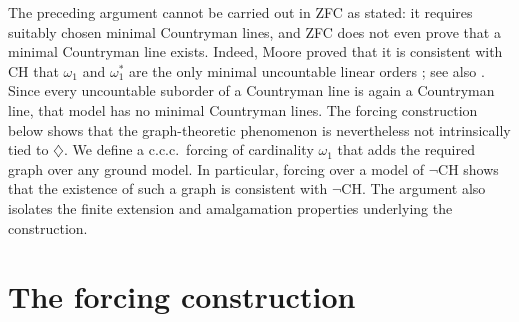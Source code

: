 \documentclass[10pt,a4paper]{amsart}
\numberwithin{equation}{section}
\theoremstyle{definition}
\theoremstyle{remark}
\begin{document}
The preceding argument cannot be carried out in ZFC as stated: it
requires suitably chosen minimal Countryman lines, and ZFC does not
even prove that a minimal Countryman line exists.  Indeed, Moore proved
that it is consistent with CH that $\omega_1$ and $\omega_1^*$ are the
only minimal uncountable linear orders \cite{Moore2007}; see also
\cite[Theorem~1.10]{CummingsEisworthMoore2024}.  Since every
uncountable suborder of a Countryman line is again a Countryman line,
that model has no minimal Countryman lines.  The forcing construction
below shows that the graph-theoretic phenomenon is nevertheless not
intrinsically tied to $\diamondsuit$.  We define a c.c.c.\ forcing of
cardinality $\omega_1$ that adds the required graph over any ground
model.  In particular, forcing over a model of $\neg$CH shows that the
existence of such a graph is consistent with $\neg$CH.  The argument
also isolates the finite extension and amalgamation properties
underlying the construction.

\section{The forcing construction}
\end{document}

